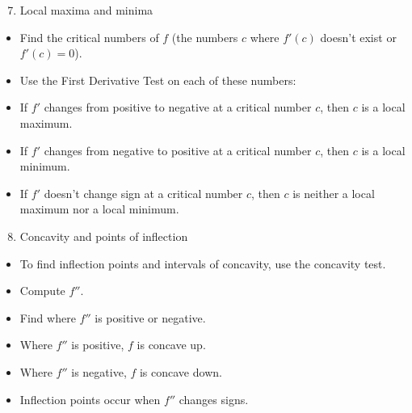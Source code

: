 \begin{frame}[t]
\begin{enumerate}
\setcounter{enumi}{6}
\item  Local maxima and minima
\end{enumerate}
\begin{itemize}
\item  Find the critical numbers of $f$ (the numbers $c$ where $f'(c)$ doesn't exist or $f'(c) = 0$).
\item  Use the First Derivative Test on each of these numbers:
\item  If $f'$ changes from positive to negative at a critical number $c$, then $c$ is a local maximum.
\item  If $f'$ changes from negative to positive at a critical number $c$, then $c$ is a local minimum.
\item  If $f'$ doesn't change sign at a critical number $c$, then $c$ is neither a local maximum nor a local minimum.
\end{itemize}
\end{frame}



\begin{frame}[t]
\begin{enumerate}
\setcounter{enumi}{7}
\item  Concavity and points of inflection
\end{enumerate}
\begin{itemize}
\item  To find inflection points and intervals of concavity, use the concavity test.
\item  Compute $f''$.
\item  Find where $f''$ is positive or negative.
\item  Where $f''$ is positive, $f$ is concave up.
\item  Where $f''$ is negative, $f$ is concave down.
\item  Inflection points occur when $f''$ changes signs.
\end{itemize}
\end{frame}
